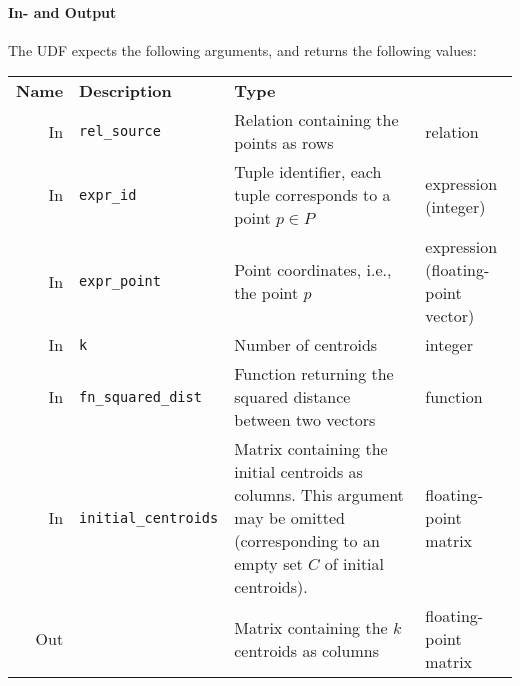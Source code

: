 \paragraph{In- and Output} The UDF expects the following arguments, and returns the following values:

\begin{center}
	\begin{tabularx}{\textwidth}{rlXl}
		\toprule%
		\textbf{Name} & \textbf{Description} & \textbf{Type}
		\\\otoprule
		In &
		\texttt{rel\_source} &
		Relation containing the points as rows &
		relation
		\\\midrule
		In &
		\texttt{expr\_id} &
		Tuple identifier, each tuple corresponds to a point $p \in P$ &
		\specialcell{l}{expression\\ (integer)}
		\\\midrule
		In &
		\texttt{expr\_point} &
		Point coordinates, i.e., the point $p$ &
		\specialcell{l}{expression\\ (floating-point vector)}
		\\\midrule
		In &
		\texttt{k} &
		Number of centroids &
		integer
		\\\midrule
		In &
		\texttt{fn\_squared\_dist} &
		Function returning the squared distance between two vectors &
		function
		\\\midrule
		In &
		\texttt{initial\_centroids} &
		Matrix containing the initial centroids as columns. This argument may be omitted (corresponding to an empty set $C$ of initial centroids). &
		floating-point matrix
		\\\midrule
		Out &
		&
		Matrix containing the $k$ centroids as columns &
		floating-point matrix
		\\\bottomrule
	\end{tabularx}
\end{center}

